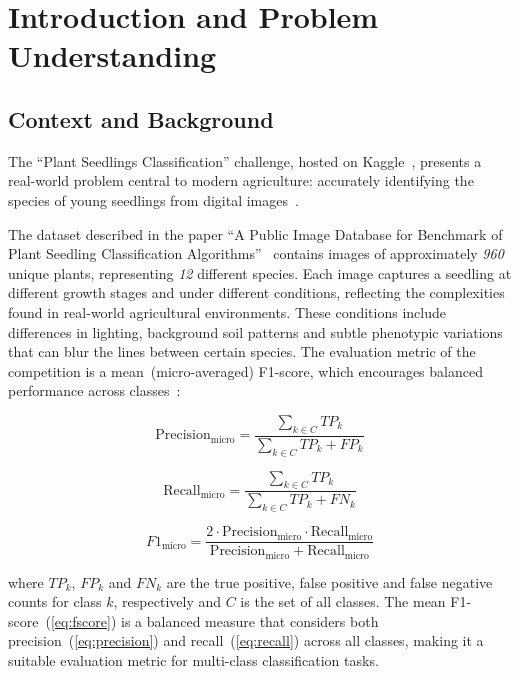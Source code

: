 \section{Introduction and Problem Understanding}

\subsection{Context and Background}
The ``Plant Seedlings Classification'' challenge, hosted on Kaggle~\cite{plant-seedlings-classification}, presents a real-world problem central to modern agriculture: accurately identifying the species of young seedlings from digital images~\cite{MESHRAM2021100010}.

The dataset described in the paper ``A Public Image Database for Benchmark of Plant Seedling Classification Algorithms''~\cite{DBLP:journals/corr/abs-1711-05458} contains images of approximately \textit{960} unique plants, representing \textit{12} different species. Each image captures a seedling at different growth stages and under different conditions, reflecting the complexities found in real-world agricultural environments. These conditions include differences in lighting, background soil patterns and subtle phenotypic variations that can blur the lines between certain species. The evaluation metric of the competition is a mean~(micro-averaged) F1-score, which encourages balanced performance across classes~\cite{plant-seedlings-classification-evaluation}:

\begin{equation}
    \text{Precision}_{\text{micro}} = \frac{\sum_{k \in C} TP_k}{\sum_{k \in C} TP_k + FP_k}\label{eq:precision}
\end{equation}

\begin{equation}
    \text{Recall}_{\text{micro}} = \frac{\sum_{k \in C} TP_k}{\sum_{k \in C} TP_k + FN_k}\label{eq:recall}
\end{equation}

\begin{equation}
    F1_{\text{micro}} = \frac{2 \cdot \text{Precision}_{\text{micro}} \cdot \text{Recall}_{\text{micro}}}{\text{Precision}_{\text{micro}} + \text{Recall}_{\text{micro}}}\label{eq:fscore}
\end{equation}

where $TP_k$, $FP_k$ and $FN_k$ are the true positive, false positive and false negative counts for class $k$, respectively and $C$ is the set of all classes. The mean F1-score~(\ref{eq:fscore}) is a balanced measure that considers both precision~(\ref{eq:precision}) and recall~(\ref{eq:recall}) across all classes, making it a suitable evaluation metric for multi-class classification tasks.


